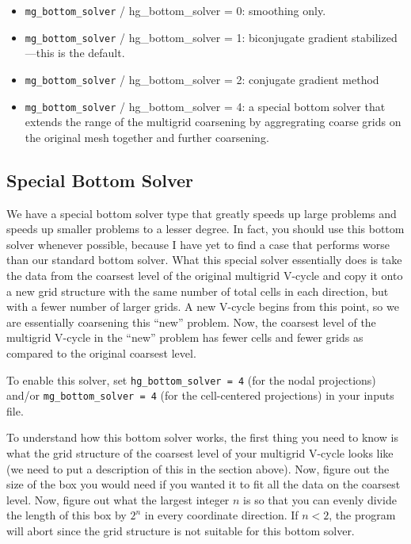 \begin{itemize}

\item {\tt mg\_bottom\_solver} / {hg\_bottom\_solver} = 0: smoothing only.

\item {\tt mg\_bottom\_solver} / {hg\_bottom\_solver} = 1: biconjugate
  gradient stabilized---this is the default.

\item {\tt mg\_bottom\_solver} / {hg\_bottom\_solver} = 2: conjugate
  gradient method

\item {\tt mg\_bottom\_solver} / {hg\_bottom\_solver} = 4: a special 
  bottom solver that extends the range of the multigrid coarsening
  by aggregrating coarse grids on the original mesh together and
  further coarsening. 

\end{itemize}


\subsection{Special Bottom Solver}
We have a special bottom solver type that greatly speeds up large problems
and speeds up smaller problems to a lesser degree.
In fact, you should use this bottom solver whenever possible, because I
have yet to find a case that performs worse than our standard bottom solver.
What this special solver essentially does is take the data from the coarsest 
level of the original multigrid V-cycle and copy it onto a new grid structure 
with the same number of total cells in each direction, but with a fewer number of larger 
grids.  A new V-cycle begins from this point, 
so we are essentially coarsening this ``new'' problem.
Now, the coarsest level of the multigrid V-cycle in the ``new'' problem has 
fewer cells and fewer grids as compared to the original coarsest level.

To enable this solver, set {\tt hg\_bottom\_solver = 4} (for the nodal
projections) and/or {\tt mg\_bottom\_solver = 4} (for the cell-centered
projections) in your inputs file.

To understand how this bottom solver works, the first thing you need to know
is what the grid structure of the coarsest level of your multigrid V-cycle
looks like (we need to put a description of this in the section above).
Now, figure out the size of the box you would need if you
wanted it to fit all the data on the coarsest level.  Now, figure out what
the largest integer $n$ is so that you can evenly divide the length of this box
by $2^n$ in every coordinate direction.  If $n < 2$, the program will abort
since the grid structure is not suitable for this bottom solver.

